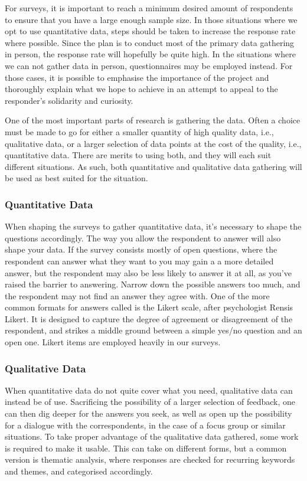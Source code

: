 For surveys, it is important to reach a minimum desired amount of respondents to ensure that you have a large enough sample size. In those situations where we opt to use quantitative data, steps should be taken to increase the response rate where possible. Since the plan is to conduct most of the primary data gathering in person, the response rate will hopefully be quite high. In the situations where we can not gather data in person, questionnaires may be employed instead. For those cases, it is possible to emphasise the importance of the project and thoroughly explain what we hope to achieve in an attempt to appeal to the responder's solidarity and curiosity. 

One of the most important parts of research is gathering the data. Often a choice must be made to go for either a smaller quantity of high quality data, i.e., qualitative data, or a larger selection of data points at the cost of the quality, i.e., quantitative data. There are merits to using both, and they will each suit different situations. As such, both quantitative and qualitative data gathering will be used as best suited for the situation.

\subsubsection{Quantitative Data}
When shaping the surveys to gather quantitative data, it's necessary to shape the questions accordingly. The way you allow the respondent to answer will also shape your data. If the survey consists mostly of open questions, where the respondent can answer what they want to you may gain a a more detailed answer, but the respondent may also be less likely to answer it at all, as you've raised the barrier to answering\citep[p.~223]{oates2005researching}. Narrow down the possible answers too much, and the respondent may not find an answer they agree with. One of the more common formats for answers called is the Likert scale, after psychologist Rensis Likert\cite{likert1932technique}. It is designed to capture the degree of agreement or disagreement of the respondent, and strikes a middle ground between a simple yes/no question and an open one. Likert items are employed heavily in our surveys.


\subsubsection{Qualitative Data}
When quantitative data do not quite cover what you need, qualitative data can instead be of use. Sacrificing the possibility of a larger selection of feedback, one can then dig deeper for the answers you seek, as well as open up the possibility for a dialogue with the correspondents, in the case of a focus group or similar situations. To take proper advantage of the qualitative data gathered, some work is required to make it usable. This can take on different forms, but a common version is thematic analysis, where responses are checked for recurring keywords and themes, and categorised accordingly.

